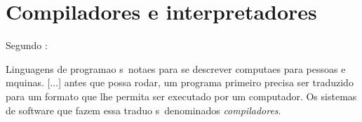 





\section{Compiladores e interpretadores}

Segundo \cite{Aho08}:

\begin{citacao}
Linguagens de programa\ca o s\ao\ nota\co es para se descrever computa\co es para pessoas e m\ah quinas. [...] antes que possa rodar, um programa primeiro precisa ser traduzido para um formato que lhe permita ser executado por um computador.
Os sistemas de software que fazem essa tradu\ca o s\ao\ denominados \emph{compiladores}.
\end{citacao}

